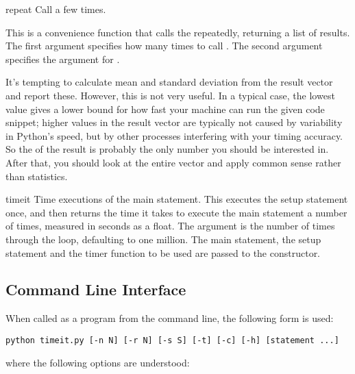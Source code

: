 \begin{methoddesc}{repeat}{}
Call  a few times.

This is a convenience function that calls the 
repeatedly, returning a list of results.  The first argument specifies
how many times to call .  The second argument
specifies the  argument for .

\begin{notice}
It's tempting to calculate mean and standard deviation from the result
vector and report these.  However, this is not very useful.  In a typical
case, the lowest value gives a lower bound for how fast your machine can run
the given code snippet; higher values in the result vector are typically not
caused by variability in Python's speed, but by other processes interfering
with your timing accuracy.  So the  of the result is
probably the only number you should be interested in.  After that, you
should look at the entire vector and apply common sense rather than
statistics.
\end{notice}
\end{methoddesc}

\begin{methoddesc}{timeit}{}
Time  executions of the main statement.
This executes the setup statement once, and then
returns the time it takes to execute the main statement a number of
times, measured in seconds as a float.  The argument is the number of
times through the loop, defaulting to one million.  The main
statement, the setup statement and the timer function to be used are
passed to the constructor.
\end{methoddesc}


\subsection{Command Line Interface}

When called as a program from the command line, the following form is used:

\begin{verbatim}
python timeit.py [-n N] [-r N] [-s S] [-t] [-c] [-h] [statement ...]
\end{verbatim}

where the following options are understood:

